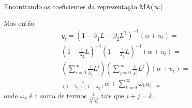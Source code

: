 \documentclass[11pt]{beamer}
\newenvironment{halfwideitemize}{\itemize\addtolength{\itemsep}{0.5em}}{\enditemize}
\begin{document}
\begin{frame}{Encontrando os coeficientes da representação MA($\infty$)}
	\begin{halfwideitemize}
		\item Mas então 
		\begin{equation}
			\begin{aligned}
				y_t = (1-\beta_1 L - \beta_2 L^2)^{-1}(\alpha + u_t) = \\ \left(1-\frac{1}{\lambda_2}L\right)^{-1}\left(1- \frac{1}{\lambda_1}L\right)^{-1}(\alpha+u_t) = \\
				 \left(\sum_{i=0}^\infty \frac{1}{\lambda_2^i} L^i\right) \left(\sum_{j=0}^\infty \frac{1}{\lambda_1^j}L^j\right)(\alpha + u_t) =\\
				 \frac{1}{(1-\lambda_1)(1-\lambda_2)}\alpha + \sum_{k=0}^\infty \omega_k u_{t-k} \end{aligned}
		\end{equation}
		onde $\omega_k$ é a soma de termos $\frac{1}{\lambda^i \lambda^j_2}$ tais que $i+j=k$. 
	\end{halfwideitemize}
\end{frame}

\end{document}
